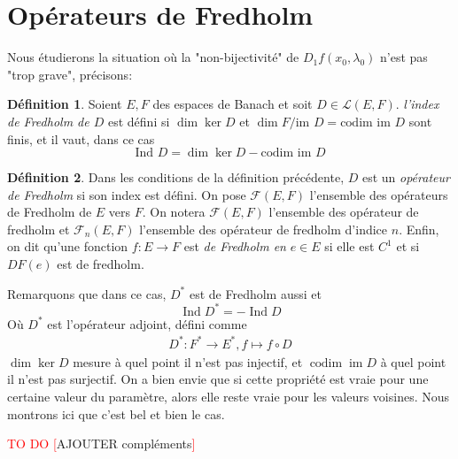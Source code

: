 \documentclass[a4paper,12pt,oneside,titlepage]{article}
\newcommand{\todo}[1]{\textcolor{red}{TO DO [}#1\textcolor{red}{]}}
\theoremstyle{definition}
\newtheorem{definition}{Définition}[section]
\theoremstyle{plain}
\begin{document}
\section{Opérateurs de Fredholm}

Nous étudierons la situation où la "non-bijectivité" de $D_{1}f(x_0,\lambda_0)$ n'est pas "trop grave", précisons:
\begin{definition}
    Soient $E,F$ des espaces de Banach et soit $D\in  \mathcal{L}(E,F)$. \textit{l'index de  Fredholm de $D$} est défini si $\dim \ker D$ et $\dim  F / \text{im } D=\text{codim } \text{im }D$ sont finis, et il vaut, dans ce cas
    \begin{equation*}
        \text{Ind }  D= \dim \ker D -\text{codim } \text{im }D
    \end{equation*}

\end{definition}

\begin{definition}
    Dans les conditions de la définition précédente, $D$ est un \textit{opérateur de Fredholm} si son index est défini. On pose $\mathcal{F}(E,F)$ l'ensemble des opérateurs de Fredholm de $E$ vers $F$. On notera $\mathcal{F}(E,F)$ l'ensemble des opérateur de fredholm et 
    $\mathcal{F}_n(E,F)$  l'ensemble des opérateur de fredholm d'indice $n$. Enfin, on dit qu'une fonction $f: E\rightarrow F$ est \textit{de Fredholm en } $e\in E$ si elle est $C^1$ et si $DF(e)$ est de fredholm.
\end{definition}
Remarquons que dans ce cas, $D^*$ est de Fredholm aussi et 
\begin{equation}\label{adjointfred}
    \operatorname*{Ind} D^*=- \operatorname*{Ind} D
\end{equation}
Où $D^{*}$ est l'opérateur adjoint, défini comme
\begin{eqnarray*}
    D^{*}: F^{*}\rightarrow E^{*}, f\mapsto  f\circ D
\end{eqnarray*}
$\dim\ker D$ mesure à quel point il 
n'est pas injectif, et $
\operatorname{codim} 
\operatorname{im} D$ à quel point 
il n'est pas surjectif. On a bien envie que si cette propriété est vraie pour une certaine valeur du paramètre, alors elle reste vraie pour les valeurs voisines. Nous montrons ici que c'est bel et bien le cas.

\todo{AJOUTER compléments}\\
\end{document}
